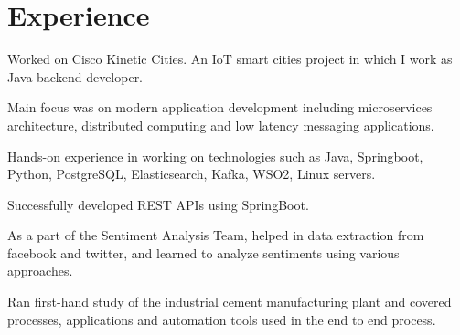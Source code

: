 \documentclass[]{plushcv}
\begin{document}
\begin{minipage}[t]{0.70\textwidth} 



\section{Experience}
\vspace{\topsep} %
\begin{tightemize}
\sectionsep
\item Worked on Cisco Kinetic Cities. An IoT smart cities project in which I work as Java backend developer. 
\item Main focus was on modern application development including microservices architecture, distributed computing and low latency messaging applications.
\item Hands-on experience in working on technologies such as Java, Springboot, Python, PostgreSQL, Elasticsearch, Kafka, WSO2, Linux servers.  
\end{tightemize}
\sectionsep

\begin{tightemize}
\sectionsep
\item Successfully developed REST APIs using SpringBoot. 
\item  As a part of the Sentiment Analysis Team, helped in data extraction from facebook and twitter, and learned to analyze sentiments using various approaches.
\end{tightemize}
\sectionsep

\begin{tightemize}
\sectionsep
\item Ran first-hand study of the industrial cement manufacturing plant and covered processes, applications and automation tools used in the end to end process.
\end{tightemize}
\sectionsep




\end{minipage}
\end{document}
